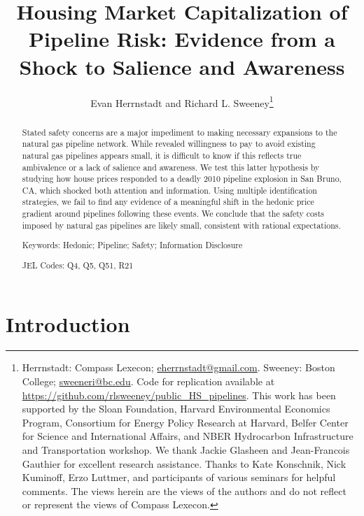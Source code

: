 \documentclass[12pt]{article}
\begin{document}
\title{Housing Market Capitalization of Pipeline Risk: Evidence from a Shock to Salience and Awareness}

\author{Evan Herrnstadt and Richard L. Sweeney\thanks{Herrnstadt: Compass Lexecon; \protect\href{mailto:eherrnstadt@gmail.com}{eherrnstadt@gmail.com}. Sweeney: Boston College; \protect\href{mailto:sweeneri@bc.edu}{sweeneri@bc.edu}. Code for replication available at \url{https://github.com/rlsweeney/public_HS_pipelines}. This work has been supported by the Sloan Foundation, Harvard Environmental Economics Program, Consortium for Energy Policy Research at Harvard, Belfer Center for Science and International Affairs, and NBER Hydrocarbon Infrastructure and Transportation workshop. We thank Jackie Glasheen and Jean-Francois Gauthier for excellent research assistance. Thanks to Kate Konschnik, Nick Kuminoff, Erzo Luttmer, and participants of various seminars for helpful comments. The views herein are the views of the authors and do not reflect or represent the views of Compass Lexecon.}}
\maketitle
\begin{abstract}
Stated safety concerns are a major impediment to making necessary expansions to the natural gas pipeline network. While revealed willingness to pay to avoid existing natural gas pipelines appears small, it is difficult to know if this reflects true ambivalence or a lack of salience and awareness. We test this latter hypothesis by studying how house prices responded to a deadly 2010 pipeline explosion in San Bruno, CA, which shocked both attention and information. Using multiple identification strategies, we fail to find any evidence of a meaningful shift in the hedonic price gradient around pipelines following these events. We conclude that the safety costs imposed by natural gas pipelines are likely small, consistent with rational expectations.

\vspace{1cm}

Keywords: Hedonic; Pipeline; Safety; Information Disclosure

JEL Codes: Q4, Q5, Q51, R21

\vspace{1cm}

\pagebreak{}
\end{abstract}

\section{Introduction}
\end{document}
